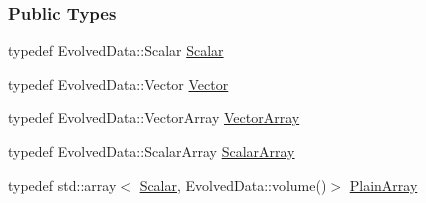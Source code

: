 \subsubsection*{Public Types}
\begin{DoxyCompactItemize}
\item 
typedef Evolved\+Data\+::\+Scalar \mbox{\hyperlink{classregu_system_aca8ee2c387943164ee3ea68370fc3ac0}{Scalar}}
\item 
typedef Evolved\+Data\+::\+Vector \mbox{\hyperlink{classregu_system_a809e01e54818f87ef4cdd47953db9e7d}{Vector}}
\item 
typedef Evolved\+Data\+::\+Vector\+Array \mbox{\hyperlink{classregu_system_aa4ecefb5c437230b994171e231450be8}{Vector\+Array}}
\item 
typedef Evolved\+Data\+::\+Scalar\+Array \mbox{\hyperlink{classregu_system_a90aade4ee474e3c49df3551515d5e7ef}{Scalar\+Array}}
\item 
typedef std\+::array$<$ \mbox{\hyperlink{classregu_system_aca8ee2c387943164ee3ea68370fc3ac0}{Scalar}}, Evolved\+Data\+::volume()$>$ \mbox{\hyperlink{classregu_system_ae2ca73edf865e016a858b694c1d2b49a}{Plain\+Array}}
\end{DoxyCompactItemize}
